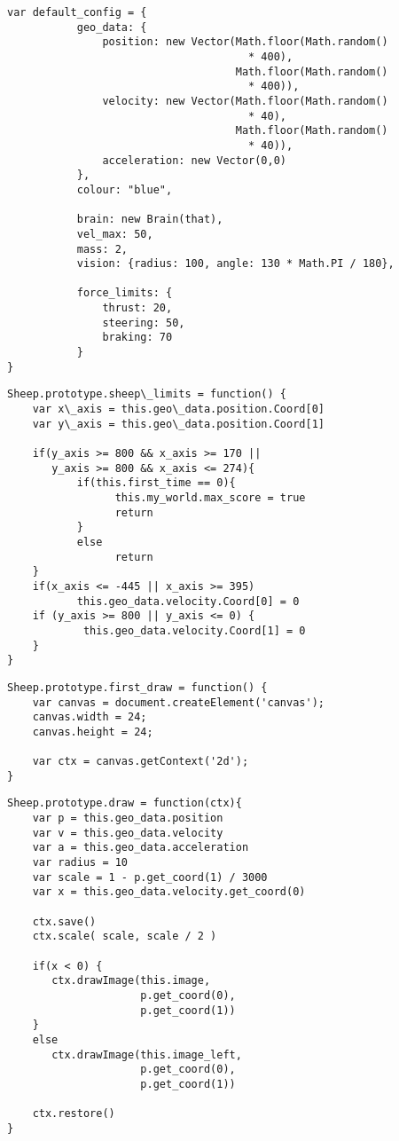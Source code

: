 \begin{lstlisting}[caption=Objeto configurable Boids]
 var default_config = {
           geo_data: {
               position: new Vector(Math.floor(Math.random()
                                      * 400), 
                                    Math.floor(Math.random()
                                      * 400)),
               velocity: new Vector(Math.floor(Math.random()
                                      * 40),
                                    Math.floor(Math.random()
                                      * 40)),
               acceleration: new Vector(0,0)
           },
           colour: "blue",

           brain: new Brain(that),
           vel_max: 50,
           mass: 2,
           vision: {radius: 100, angle: 130 * Math.PI / 180},

           force_limits: {
               thrust: 20,
               steering: 50,
               braking: 70
           }
}
\end{lstlisting}

\begin{lstlisting}[caption=Funcion sheep limits]
 Sheep.prototype.sheep\_limits = function() {
    var x\_axis = this.geo\_data.position.Coord[0]
    var y\_axis = this.geo\_data.position.Coord[1]

    if(y_axis >= 800 && x_axis >= 170 || 
       y_axis >= 800 && x_axis <= 274){
           if(this.first_time == 0){
                 this.my_world.max_score = true
                 return
           }
           else
                 return
    }
    if(x_axis <= -445 || x_axis >= 395)
           this.geo_data.velocity.Coord[0] = 0
    if (y_axis >= 800 || y_axis <= 0) {
            this.geo_data.velocity.Coord[1] = 0
    }
}
\end{lstlisting}


\begin{lstlisting}[caption=Función first draw]
 Sheep.prototype.first_draw = function() {
    var canvas = document.createElement('canvas');
    canvas.width = 24;
    canvas.height = 24;

    var ctx = canvas.getContext('2d');
}
\end{lstlisting}


\begin{lstlisting}[caption=Función draw]
 Sheep.prototype.draw = function(ctx){
    var p = this.geo_data.position
    var v = this.geo_data.velocity
    var a = this.geo_data.acceleration
    var radius = 10
    var scale = 1 - p.get_coord(1) / 3000
    var x = this.geo_data.velocity.get_coord(0)

    ctx.save()
    ctx.scale( scale, scale / 2 )

    if(x < 0) {
       ctx.drawImage(this.image, 
                     p.get_coord(0),
                     p.get_coord(1))
    }
    else
       ctx.drawImage(this.image_left, 
                     p.get_coord(0),
                     p.get_coord(1))

    ctx.restore()
}
\end{lstlisting}



